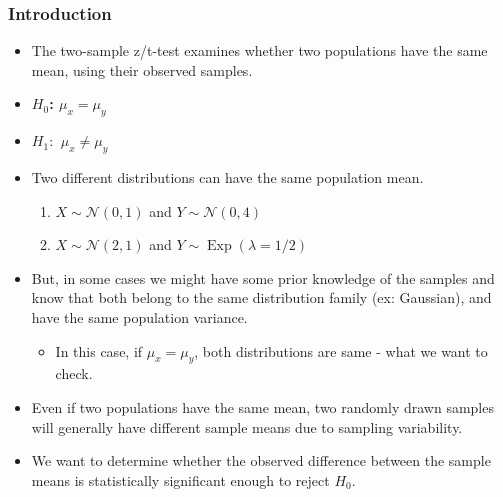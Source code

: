 \documentclass{beamer}
\begin{document}
\begin{frame}[t]
\frametitle{Introduction}
\begin{itemize}
    \item The two-sample z/t-test examines whether two populations have the same mean, using their observed samples.
    \vspace{0.5em}
    \item \textbf{$H_{0}$:  $\mu_{x} = \mu_{y}$}
    \item \textbf{$H_{1}:$  $\mu_{x} \ne \mu_{y}$}
    \vspace{0.5em}
    \item Two different distributions can have the same population mean.
    \vspace{0.5em}
    \begin{enumerate}
        \item \(X\sim\mathcal{N}(0,1)\) and \(Y\sim\mathcal{N}(0,4)\)
        \vspace{0.3em}
        \item \(X\sim\mathcal{N}(2,1)\) and \(Y\sim\operatorname{Exp}(\lambda=1/2)\)
    \end{enumerate}
    \vspace{0.5em}
    \item But, in some cases we might have some prior knowledge of the samples and know that both belong to the same distribution family (ex: Gaussian), and have the same population variance.
    \vspace{0.3em}
    \begin{itemize}
        \item In this case, if $\mu_{x} = \mu_{y}$, both distributions are same - what we want to check.
    \end{itemize}
\end{itemize}
    
\end{frame}

\begin{frame}[t]
\begin{itemize}
    \item Even if two populations have the same mean, two randomly drawn samples will generally have different sample means due to sampling variability.
    \vspace{0.3em}
    \item We want to determine whether the observed difference between the sample means is statistically significant enough to reject \(H_0\).
    
\end{itemize}
    
\end{frame}
\end{document}
